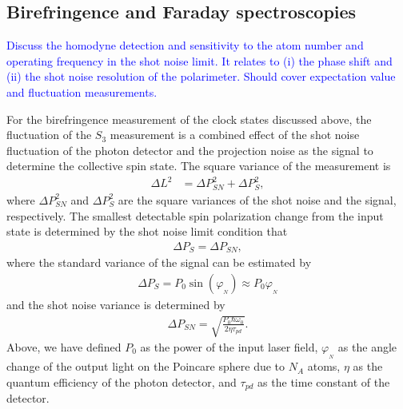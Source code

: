 \documentclass[preprint,aps,pra,onecolumn]{revtex4-1} %
\begin{document}
\subsection{Birefringence and Faraday spectroscopies}

\textcolor{blue}{Discuss the homodyne detection and sensitivity to the atom number and operating frequency in the shot noise limit.  It relates to (i) the phase shift and (ii) the shot noise resolution of the polarimeter. Should cover expectation value and fluctuation measurements.}

For the birefringence measurement of the clock states discussed above, the fluctuation of the $ S_3 $ measurement is a combined effect of the shot noise fluctuation of the photon detector and the projection noise as the signal to determine the collective spin state. The square variance of the measurement is
\begin{align}
\Delta L^2 &= \Delta P^2_{SN} + \Delta P^2_S ,
\end{align}
where $ \Delta P^2_{SN} $ and $ \Delta P^2_{S} $ are the square variances of the shot noise and the signal, respectively. 
The smallest detectable spin polarization change from the input state is determined by the shot noise limit condition that 
\begin{align}
\Delta P_S = \Delta P_{SN},
\end{align}
where the standard variance of the signal can be estimated by
\begin{align}
\Delta P_S=P_0 \sin(\varphi_{_N}) \approx P_0 \varphi_{_N}
\end{align}
and the shot noise variance is determined by~\cite{Smith2003a}
\begin{align}
\Delta P_{SN} = \sqrt{\frac{P_0 \hbar \omega_0 }{2\eta \tau_{pd}}}.
\end{align}
Above, we have defined $P_0$ as the power of the input laser field, $\varphi_{_N}$ as the angle change 
of the output light on the Poincare sphere due to $N_A$ atoms, $\eta$ as the quantum efficiency of the 
photon detector, and $\tau_{pd}$ as the time constant of the detector. 
\end{document}
